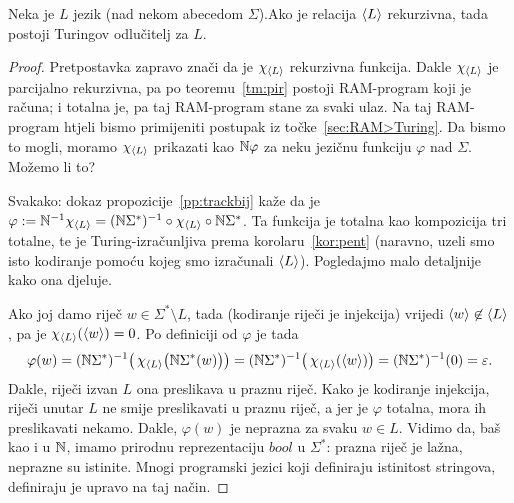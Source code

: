 \begin{teorem}[{name=[Turing-odlučivost rekurzivnog jezika]}]\label{tm:krio}
Neka je $L$ jezik (nad nekom abecedom $\Sigma$).\newline Ako je relacija $\langle L\rangle$ rekurzivna, tada postoji Turingov odlučitelj za $L$.
\end{teorem}
\begin{proof}
Pretpostavka zapravo znači da je $\chi_{\langle L\rangle}$ rekurzivna funkcija. Dakle $\chi_{\langle L\rangle}$ je parcijalno rekurzivna, pa po teoremu~\ref{tm:pir} postoji RAM-program koji je računa; i totalna je, pa taj RAM-program stane za svaki ulaz. Na taj RAM-program htjeli bismo primijeniti postupak iz točke~\ref{sec:RAM>Turing}. Da bismo to mogli, moramo $\chi_{\langle L\rangle}$ prikazati kao ${\mathbb N}\varphi$ za neku jezičnu funkciju $\varphi$ nad $\Sigma$. Možemo li to?

Svakako: dokaz propozicije~\ref{pp:trackbij} kaže da je $\varphi:={\mathbb N}^{-1}\chi_{\langle L\rangle}=({\mathbb N}\Sigma^*)^{-1}\circ\chi_{\langle L\rangle}\circ{\mathbb N}\Sigma^*$. Ta funkcija je totalna kao kompozicija tri totalne, te je Turing-izračunljiva prema korolaru~\ref{kor:pent} (naravno, uzeli smo isto kodiranje pomoću kojeg smo izračunali $\langle L\rangle$). Pogledajmo malo detaljnije kako ona djeluje.

Ako joj damo riječ $w\in\Sigma^*\setminus L$, tada (kodiranje riječi je injekcija) vrijedi $\langle w\rangle\not\in\langle L\rangle$, pa je $\chi_{\langle L\rangle}(\langle w\rangle)=0$. Po definiciji od $\varphi$ je tada
\begin{equation}
    \varphi(w)=({\mathbb N}\Sigma^*)^{-1}\bigl(\,\chi_{\langle L\rangle}\bigl({\mathbb N}\Sigma^*(w)\bigr)\bigr)=({\mathbb N}\Sigma^*)^{-1}\bigl(\,\chi_{\langle L\rangle}(\langle w\rangle)\bigr)=({\mathbb N}\Sigma^*)^{-1}(0)=\varepsilon\text.
\end{equation}
Dakle, riječi izvan $L$ ona preslikava u praznu riječ. Kako je kodiranje injekcija, riječi unutar $L$ ne smije preslikavati u praznu riječ, a jer je $\varphi$ totalna, mora ih preslikavati nekamo. Dakle, $\varphi(w)$ je neprazna za svaku $w\in L$.
Vidimo da, baš kao i u ${\mathbb N}$, imamo prirodnu reprezentaciju $bool$ u $\Sigma^*$: prazna riječ je lažna, neprazne su istinite. Mnogi programski jezici koji definiraju istinitost stringova, definiraju je upravo na taj način.



\end{proof}
